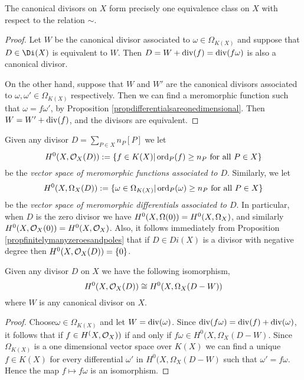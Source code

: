     \begin{cor}
    The canonical divisors on $X$ form precisely one equivalence class on $X$ with respect to the relation $\sim$.
    \end{cor}
    \begin{proof}
    Let $W$ be the canonical divisor associated to $\omega \in \Omega_{K(X)}$ and suppose that $D \in \Di(X)$ is equivalent to $W$.
    Then $D = W + \operatorname{div}(f) = \operatorname{div}(f \omega)$ is also a canonical divisor.

    On the other hand, suppose that $W$ and $W'$ are the canonical divisors associated to $\omega, \omega' \in \Omega_{K(X)}$ respectively.
    Then we can find a meromorphic function such that $\omega = f\omega'$, by Proposition \ref{propdifferentialsareonedimensional}.
    Then $W = W' + \operatorname{div}(f)$, and the divisors are equivalent.
    \end{proof}

Given any divisor $D = \sum_{P \in X} n_P[P]$ we let
    \[
    H^0(X,{\cal O}_X(D)) : = \{ f \in K(X) | \operatorname{ord}_P(f) \geq n_P\ \text{for all}\ P \in X\}
    \]
be the \emph{vector space of meromorphic functions associated to $D$}.
Similarly, we let 
    \[
    H^0(X,\Omega_X(D)) :  = \{ \omega \in \Omega_{K(X)} | \ord_P(\omega) \geq n_P \ \text{for all} \ P \in X\}
    \]
be the \emph{vector space of meromorphic differentials associated to $D$}.
In particular, when $D$ is the zero divisor we have $H^0(X,\Omega(0)) = {H^0(X,\Omega_X)}$, and similarly $H^0(X,{\cal O}_X(0)) = H^0(X,{\cal O}_X)$.
Also, it follows immediately from Proposition \ref{propfinitelymanyzeroesandpoles} that if $D \in Di(X)$ is a divisor with negative degree then $H^0(X,{\cal O}_X(D)) = \{0\}$.

    \begin{lem}
    Given any divisor $D$ on $X$ we have the following isomorphism,
        \[
        H^0(X,{\cal O}_X(D)) \cong H^0(X,\Omega_X(D - W))
        \]
    where $W$ is any canonical divisor on $X$.
    \end{lem}
    \begin{proof}
    Choose$\omega \in \Omega_{K(X)}$ and let $W = \operatorname{div}(\omega)$.
    Since $\operatorname{div}(f \omega) = \operatorname{div}(f) + \operatorname{div}(\omega)$, it follows that if $f \in H^(X,{\cal O}_X))$ if and only if $f \omega \in H^0(X,\Omega_X(D - W)$.
    Since $\Omega_{K(X)}$ is a one dimensional vector space over $K(X)$ we can find a unique $f \in K(X)$ for every differential $\omega'$ in $H^0(X,\Omega_X(D - W)$ such that $\omega' = f \omega$.
    Hence the map $f \mapsto f\omega$ is an isomorphism.
    \end{proof}

